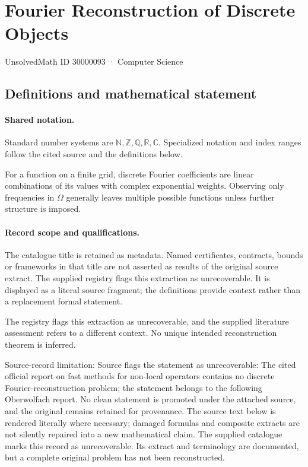 \documentclass[11pt]{article}
\begin{document}
\setcounter{section}{30000092}
\section{Fourier Reconstruction of Discrete Objects}\label{30000093}
{\small\sffamily UnsolvedMath ID 30000093 · Computer Science}
\subsection{Definitions and mathematical statement}

\paragraph{Shared notation.}Standard number systems are $\mathbb N,\mathbb Z,\mathbb Q,\mathbb R,\mathbb C$. Specialized notation and index ranges follow the cited source and the definitions below.


For a function on a finite grid, discrete Fourier coefficients are linear combinations of its values with complex exponential weights. Observing only frequencies in $\Omega$ generally leaves multiple possible functions unless further structure is imposed.
\paragraph{Record scope and qualifications.}
The catalogue title is retained as metadata. Named certificates, contracts, bounds or frameworks in that title are not asserted as results of the original source extract.
The supplied registry flags this extraction as unrecoverable. It is displayed as a literal source fragment; the definitions provide context rather than a replacement formal statement.

The registry flags this extraction as unrecoverable, and the supplied literature assessment refers to a different context. No unique intended reconstruction theorem is inferred.

Source-record limitation: Source flags the statement as unrecoverable: The cited official report on fast methods for non-local operators contains no discrete Fourier-reconstruction problem; the statement belongs to the following Oberwolfach report. No clean statement is promoted under the attached source, and the original remains retained for provenance.
The source text below is rendered literally where necessary; damaged formulas and composite extracts are not silently repaired into a new mathematical claim.
The supplied catalogue marks this record as unrecoverable. Its extract and terminology are documented, but a complete original problem has not been reconstructed.
\end{document}

